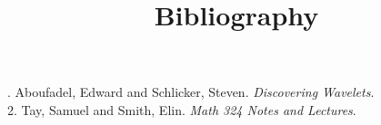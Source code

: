 \documentclass[11 pt]{article}
\title{Bibliography}
\begin{document}
\maketitle

. Aboufadel, Edward and Schlicker, Steven. \emph{Discovering Wavelets}.\\
2. Tay, Samuel and Smith, Elin. \emph{Math 324 Notes and Lectures}.\\
\end{document}
